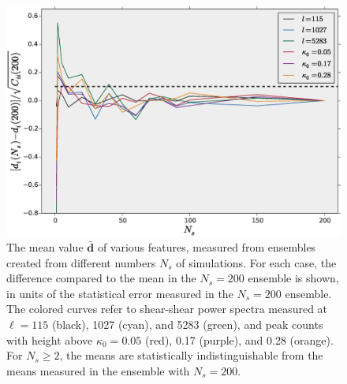 \documentclass[reprint,aps,prd,superscriptaddress,showkeys,showpacs]{revtex4-1}
\newcommand{\bb}[1]{\mathbf{#1}}
\begin{document}
\begin{figure}
\includegraphics[scale=0.3]{Figures/means_ns.eps}
\caption{The mean value 
 $\bb{\bar{d}}$
  of various features, measured from ensembles created from different
  numbers $N_s$ of simulations.  For each case, the difference compared
  to the mean in the $N_s=200$ ensemble is shown, in units of the
  statistical error measured in the $N_s=200$ ensemble.  The colored
  curves refer to shear-shear power spectra measured at $\ell=115$
  (black), 1027 (cyan), and 5283 (green), and peak counts 
  with height above $\kappa_0=0.05$ (red), 0.17 (purple), and 0.28
  (orange).  For $N_s\geq 2$, the means are statistically
  indistinguishable from the means measured in the ensemble with $N_s=200$.}
\label{means_ns}
\end{figure}
\end{document}
